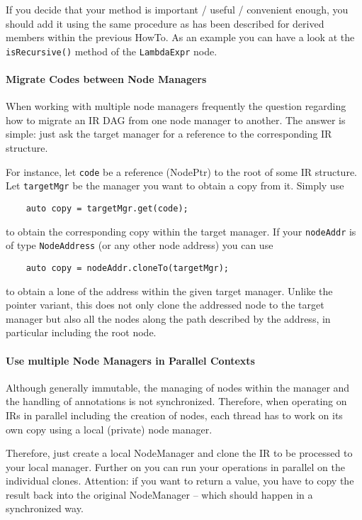 If you decide that your method is important / useful / convenient enough, you
should add it using the same procedure as has been described for derived members
within the previous HowTo. As an example you can have a look at the
\lstinline|isRecursive()| method of the \lstinline|LambdaExpr| node.


\paragraph{Migrate Codes between Node Managers}
When working with multiple node managers frequently the question regarding how
to migrate an IR DAG from one node manager to another. The answer is simple:
just ask the target manager for a reference to the corresponding IR structure.

For instance, let \lstinline|code| be a reference (NodePtr) to the root of some
IR structure. Let \lstinline|targetMgr| be the manager you want to obtain a copy
from it. Simply use 
\begin{lstlisting}
	auto copy = targetMgr.get(code);
\end{lstlisting}
to obtain the corresponding copy within the target manager. If your
\lstinline|nodeAddr| is of type \lstinline|NodeAddress| (or any other node
address) you can use 
\begin{lstlisting}
	auto copy = nodeAddr.cloneTo(targetMgr);
\end{lstlisting}
to obtain a lone of the address within the given target manager. Unlike the
pointer variant, this does not only clone the addressed node to the target
manager but also all the nodes along the path described by the address,
in particular including the root node.

\paragraph{Use multiple Node Managers in Parallel Contexts}
Although generally immutable, the managing of nodes within the manager and the
handling of annotations is not synchronized.  Therefore, when operating on IRs in
parallel including the creation of nodes, each thread has to work on its own
copy using a local (private) node manager. 

Therefore, just create a local NodeManager and clone the IR to be processed to
your local manager. Further on you can run your operations in parallel on the
individual clones. Attention: if you want to return a value, you have to copy
the result back into the original NodeManager -- which should happen in a
synchronized way.

